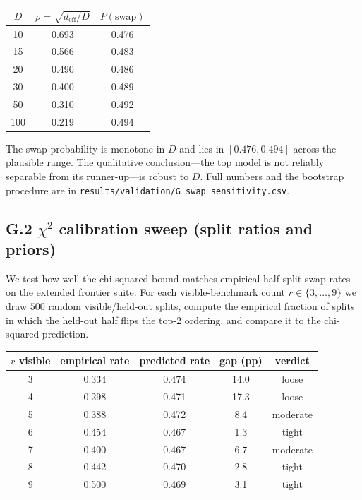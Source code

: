 \documentclass{article}
\begin{document}
\begin{center}\small
\begin{tabular}{ccc}
\toprule
$D$ & $\rho = \sqrt{d_{\mathrm{eff}}/D}$ & $P(\text{swap})$ \\
\midrule
10  & 0.693 & 0.476 \\
15  & 0.566 & 0.483 \\
20  & 0.490 & 0.486 \\
30  & 0.400 & 0.489 \\
50  & 0.310 & 0.492 \\
100 & 0.219 & 0.494 \\
\bottomrule
\end{tabular}
\end{center}

The swap probability is monotone in $D$ and lies in $[0.476, 0.494]$
across the plausible range. The qualitative conclusion---the top model
is not reliably separable from its runner-up---is robust to $D$. Full
numbers and the bootstrap procedure are in
\texttt{results/validation/G\_swap\_sensitivity.csv}.

\subsection*{G.2 $\chi^2$ calibration sweep (split ratios and priors)}

We test how well the chi-squared bound matches empirical half-split
swap rates on the extended frontier suite. For each visible-benchmark
count $r \in \{3, \ldots, 9\}$ we draw $500$ random visible/held-out
splits, compute the empirical fraction of splits in which the held-out
half flips the top-2 ordering, and compare it to the chi-squared
prediction.

\begin{center}\small
\begin{tabular}{ccccc}
\toprule
$r$ visible & empirical rate & predicted rate & gap (pp) & verdict \\
\midrule
3 & 0.334 & 0.474 & 14.0 & loose \\
4 & 0.298 & 0.471 & 17.3 & loose \\
5 & 0.388 & 0.472 &  8.4 & moderate \\
6 & 0.454 & 0.467 &  1.3 & tight \\
7 & 0.400 & 0.467 &  6.7 & moderate \\
8 & 0.442 & 0.470 &  2.8 & tight \\
9 & 0.500 & 0.469 &  3.1 & tight \\
\bottomrule
\end{tabular}
\end{center}
\end{document}
